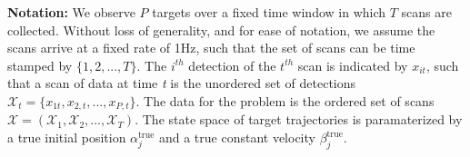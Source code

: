 {\bf Notation:}
We observe $P$ targets over a fixed time window in which $T$ scans are collected. Without loss of generality, and for ease of notation,  we assume the scans arrive at a fixed rate of 1Hz, such that the set of scans can be time stamped by $\{1, 2,...,T\}. $ The $i^{th}$ detection of the $t^{th}$ scan is indicated by $x_{it}$, such that a scan of data at time \textit{t} is the unordered set of detections $\mathcal{X}_{t} = \{x_{1t}, x_{2,t},...,x_{P,t}\}$. The data for the problem is the ordered set of scans $\boldsymbol{\mathcal{X}}=(\mathcal{X}_{1},\mathcal{X}_{2},...,\mathcal{X}_{T})$. The state space of target trajectories is paramaterized by a true initial position $\alpha^{\text{true}}_{j}$ and a true constant velocity $\beta^{\text{true}}_{j}$. 